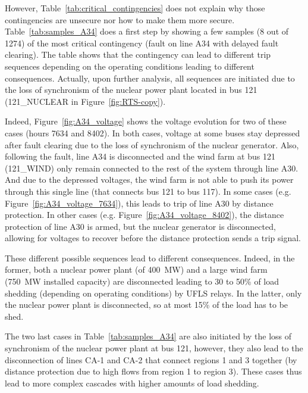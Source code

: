 However, Table~\ref{tab:critical_contingencies} does not explain why those contingencies are unsecure nor how to make them more secure. Table~\ref{tab:samples_A34} does a first step by showing a few samples (8 out of 1274) of the most critical contingency (fault on line A34 with delayed fault clearing). The table shows that the contingency can lead to different trip sequences depending on the operating conditions leading to different consequences. Actually, upon further analysis, all sequences are initiated due to the loss of synchronism of the nuclear power plant located in bus 121 (121\_NUCLEAR in Figure~\ref{fig:RTS-copy}).

Indeed, Figure~\ref{fig:A34_voltage} shows the voltage evolution for two of these cases (hours 7634 and 8402). In both cases, voltage at some buses stay depressed after fault clearing due to the loss of synchronism of the nuclear generator. Also, following the fault, line A34 is disconnected and the wind farm at bus 121 (121\_WIND) only remain connected to the rest of the system through line A30. And due to the depressed voltages, the wind farm is not able to push its power through this single line (that connects bus 121 to bus 117). In some cases (e.g. Figure~\ref{fig:A34_voltage_7634}), this leads to trip of line A30 by distance protection. In other cases (e.g. Figure~\ref{fig:A34_voltage_8402}), the distance protection of line A30 is armed, but the nuclear generator is disconnected, allowing for voltages to recover before the distance protection sends a trip signal.

These different possible sequences lead to different consequences. Indeed, in the former, both a nuclear power plant (of 400~MW) and a large wind farm (750~MW installed capacity) are disconnected leading to 30 to 50\% of load shedding (depending on operating conditions) by UFLS relays. In the latter, only the nuclear power plant is disconnected, so at most 15\% of the load has to be shed.

The two last cases in Table~\ref{tab:samples_A34} are also initiated by the loss of synchronism of the nuclear power plant at bus 121, however, they also lead to the disconnection of lines CA-1 and CA-2 that connect regions 1 and 3 together (by distance protection due to high flows from region 1 to region 3). These cases thus lead to more complex cascades with higher amounts of load shedding.


